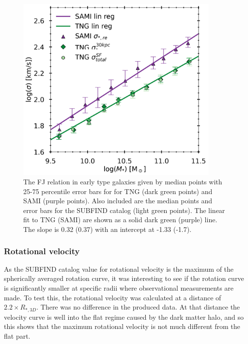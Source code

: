 \begin{figure}
    \centering
    \includegraphics[width=0.9\textwidth]{images/FJ.png}
    \caption{The FJ relation in early type galaxies given by median points with 25-75 percentile error bars for for TNG (dark green points) and SAMI (purple points). Also included are the median points and error bars for the SUBFIND catalog (light green points). The linear fit to TNG (SAMI) are shown as a solid dark green (purple) line. The slope is 0.32 (0.37) with an intercept at -1.33 (-1.7). }
    \label{FJ}
\end{figure}


\subsubsection{Rotational velocity}
As the SUBFIND catalog value for rotational velocity is the maximum of the spherically averaged rotation curve, it was interesting to see if the rotation curve is significantly smaller at specific radii where observational measurements are made. To test this, the rotational velocity was calculated at a distance of $2.2 \times R_{*, 3D}$. There was no difference in the produced data. At that distance the velocity curve is well into the flat regime caused by the dark matter halo, and so this shows that the maximum rotational velocity is not much different from the flat part.


